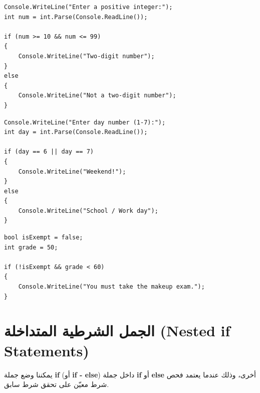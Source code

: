 \documentclass[14pt]{extarticle}
\begin{document}
\begin{boxExample}
\begin{english}
\begin{verbatim}
Console.WriteLine("Enter a positive integer:");
int num = int.Parse(Console.ReadLine());

if (num >= 10 && num <= 99)
{
    Console.WriteLine("Two-digit number");
}
else
{
    Console.WriteLine("Not a two-digit number");
}
\end{verbatim}
\end{english}
\end{boxExample}

\begin{boxExample}
\begin{english}
\begin{verbatim}
Console.WriteLine("Enter day number (1-7):");
int day = int.Parse(Console.ReadLine());

if (day == 6 || day == 7)
{
    Console.WriteLine("Weekend!");
}
else
{
    Console.WriteLine("School / Work day");
}
\end{verbatim}
\end{english}
\end{boxExample}

\begin{boxExample}
\begin{english}
\begin{verbatim}
bool isExempt = false;
int grade = 50;

if (!isExempt && grade < 60)
{
    Console.WriteLine("You must take the makeup exam.");
}
\end{verbatim}
\end{english}
\end{boxExample}

\clearpage
\section{الجمل الشرطية المتداخلة (\textenglish{Nested if Statements})}

يمكننا وضع جملة \textbf{\textenglish{if}} (أو \textbf{\textenglish{if - else}}) داخل جملة \textbf{\textenglish{if}} أو \textbf{\textenglish{else}} أخرى، وذلك عندما يعتمد فحص شرط معيّن على تحقق شرط سابق.
\end{document}
